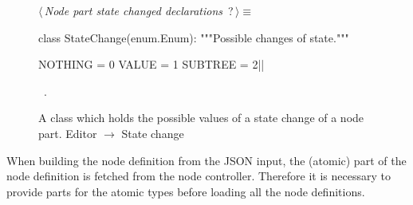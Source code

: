 \documentclass[%
    a4paper,    %
    justified,  %
    nobib,      %
    openany     %
]{tufte-book}
\begin{document}
\begin{figure}
\begin{flushleft} \small
\begin{minipage}{\linewidth}\label{scrap118}\raggedright\small
{} $\langle\,${\itshape Node part state changed declarations}\nobreak\ {\footnotesize {?}}$\,\rangle\equiv$
\vspace{-1ex}
\begin{pythoncode}
class StateChange(enum.Enum):
    """Possible changes of state."""

    NOTHING  = 0
    VALUE    = 1
    SUBTREE  = 2|\NWsep|
\end{pythoncode}
\vspace{1.5ex}
\footnotesize
\begin{list}{}{\setlength{\itemsep}{-\parsep}\setlength{\itemindent}{-\leftmargin}}
\item \NWtxtMacroRefIn\ .

\item{}
\end{list}
\end{minipage}\vspace{4ex}
\end{flushleft}
\caption{A class which holds the possible values of a state change of a node
  part.
  \newline{}\newline{}Editor $\rightarrow$ State change}
\label{editor:lst:state-change}
\end{figure}

 When building
the node definition from the JSON input, the (atomic) part of the node
definition is fetched from the node controller. Therefore it is necessary to
provide parts for the atomic types before loading all the node definitions.
\end{document}
